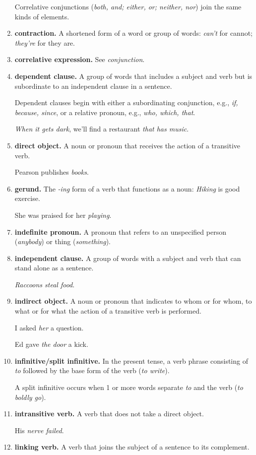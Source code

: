 \documentclass{article}
\begin{document}
\begin{enumerate}
	Correlative conjunctions ({\it both, and; either, or; neither, nor}) join the same kinds of elements.
	\item {\bf contraction.} A shortened form of a word or group of words: {\it can't} for cannot; {\it they're} for they are.
	\item {\bf correlative expression.} See {\it conjunction}.
	\item {\bf dependent clause.} A group of words that includes a subject and verb but is subordinate to an independent clause in a sentence.
	
	Dependent clauses begin with either a subordinating conjunction, e.g., {\it if, because, since}, or a relative pronoun, e.g., {\it who, which, that}.
	
	{\it When it gets dark}, we'll find a restaurant {\it that has music}.
	\item {\bf direct object.} A noun or pronoun that receives the action of a transitive verb.
	
	Pearson publishes {\it books}.
	\item {\bf gerund.} The {\it -ing} form of a verb that functions as a noun: {\it Hiking} is good exercise.
	
	She was praised for her {\it playing}.
	\item {\bf indefinite pronoun.} A pronoun that refers to an unspecified person ({\it anybody}) or thing ({\it something}).
	\item {\bf independent clause.} A group of words with a subject and verb that can stand alone as a sentence.
	
	{\it Raccoons steal food}.
	\item {\bf indirect object.} A noun or pronoun that indicates to whom or for whom, to what or for what the action of a transitive verb is performed.
	
	I asked {\it her} a question.
	
	Ed gave {\it the door} a kick.
	\item {\bf infinitive/split infinitive.} In the present tense, a verb phrase consisting of {\it to} followed by the base form of the verb ({\it to write}).
	
	A split infinitive occurs when 1 or more words separate {\it to} and the verb ({\it to boldly go}).
	\item {\bf intransitive verb.} A verb that does not take a direct object.
	
	His {\it nerve failed}.
	\item {\bf linking verb.} A verb that joins the subject of a sentence to its complement.
	

\end{enumerate}
\end{document}
